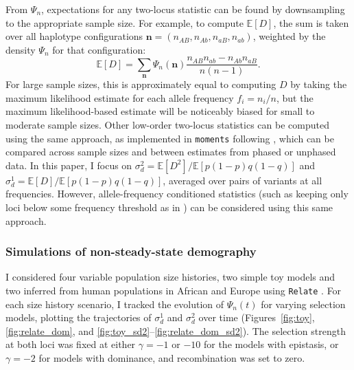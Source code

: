 \documentclass[]{article}
\newcommand{\E}{\mathbb{E}}
\begin{document}
From \(\Psi_n\), expectations for any two-locus statistic can be found by
downsampling to the appropriate sample size. For example, to compute \(\E[D]\),
the sum is taken over all haplotype configurations \(\mathbf{n} = (n_{AB},
n_{Ab}, n_{aB}, n_{ab})\), weighted by the density \(\Psi_n\) for that
configuration:
\begin{equation}
\E[D] = \sum_{\mathbf{n}} \Psi_n(\mathbf{n})
\frac{n_{AB}n_{ab} - n_{Ab}n_{aB}}{n(n-1)}.
\end{equation}
For large sample sizes, this is approximately equal to computing \(D\) by
taking the maximum likelihood estimate for each allele frequency \(f_i = n_i /
n\), but the maximum likelihood-based estimate will be noticeably biased for
small to moderate sample sizes. Other low-order two-locus statistics can be
computed using the same approach, as implemented in \texttt{moments} following
\citet{Ragsdale2020-nz}, which can be compared across sample sizes and between
estimates from phased or unphased data. In this paper, I focus on \(\sigma_d^2
= \E[D^2] / \E[p(1-p)q(1-q)]\) and \(\sigma_d^1 = \E[D] / \E[p(1-p)q(1-q)]\),
averaged over pairs of variants at all frequencies. However, allele-frequency
conditioned statistics (such as keeping only loci below some frequency
threshold as in \citet{Good2022-ot}) can be considered using this same
approach.

\subsubsection{Simulations of non-steady-state demography}

I considered four variable population size histories, two simple toy models and
two inferred from human populations in African and Europe using \texttt{Relate}
\citep{Speidel2019-nj}. For each size history scenario, I tracked the evolution
of \(\Psi_n(t)\) for varying selection models, plotting the trajectories of
\(\sigma_d^1\) and \(\sigma_d^2\) over time (Figures~\ref{fig:toy},
\ref{fig:relate_dom}, and \ref{fig:toy_sd2}--\ref{fig:relate_dom_sd2}). The
selection strength at both loci was fixed at either \(\gamma=-1\) or \(-10\)
for the models with epistasis, or \(\gamma=-2\) for models with dominance, and
recombination was set to zero.
\end{document}
